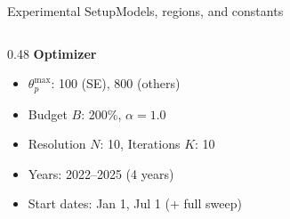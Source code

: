 \begin{frame}[t]{Experimental Setup}{Models, regions, and constants}
\begin{columns}[T]
\begin{column}{0.48\textwidth}
      \vspace{0.2cm}
      \textbf{Optimizer}
      \begin{itemize}
        \item $\theta_p^{\max}$: 100 (SE), 800 (others)
        \item Budget $B$: 200\%, $\alpha = 1.0$
        \item Resolution $N$: 10, Iterations $K$: 10
        \item Years: 2022--2025 (4 years)
        \item Start dates: Jan 1, Jul 1 (+ full sweep)
      \end{itemize}
    \end{column}
  \end{columns}

\end{frame}
